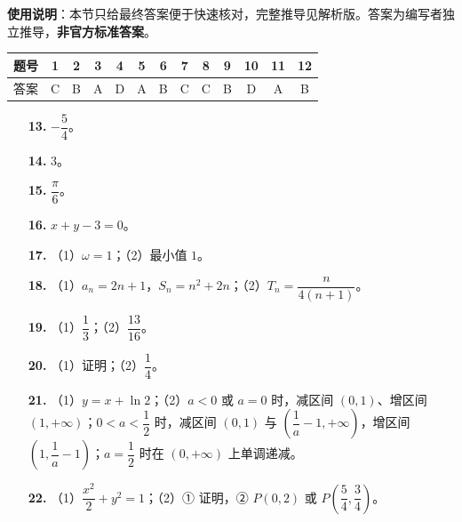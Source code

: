 
\begin{gknotice}
\textbf{使用说明}：本节只给最终答案便于快速核对，完整推导见解析版。答案为编写者独立推导，\textbf{非官方标准答案}。
\end{gknotice}

\begin{center}\begin{tabular}{ccccccccccccc}
\toprule
题号 & 1 & 2 & 3 & 4 & 5 & 6 & 7 & 8 & 9 & 10 & 11 & 12 \\
\midrule
答案 & C & B & A & D & A & B & C & C & B & D & A & B \\
\bottomrule
\end{tabular}\end{center}

\begin{itemize}[leftmargin=2.6em]
  \item[\textbf{13.}] $-\dfrac54$。
  \item[\textbf{14.}] $3$。
  \item[\textbf{15.}] $\dfrac\pi6$。
  \item[\textbf{16.}] $x+y-3=0$。
\end{itemize}

\begin{itemize}[leftmargin=2.6em]
  \item[\textbf{17.}] （1）$\omega=1$；（2）最小值 $1$。
  \item[\textbf{18.}] （1）$a_n=2n+1$，$S_n=n^2+2n$；（2）$T_n=\dfrac{n}{4(n+1)}$。
  \item[\textbf{19.}] （1）$\dfrac13$；（2）$\dfrac{13}{16}$。
  \item[\textbf{20.}] （1）证明；（2）$\dfrac14$。
  \item[\textbf{21.}] （1）$y=x+\ln2$；（2）$a<0$ 或 $a=0$ 时，减区间 $(0,1)$、增区间 $(1,+\infty)$；$0<a<\dfrac12$ 时，减区间 $(0,1)$ 与 $\left(\dfrac1a-1,+\infty\right)$，增区间 $\left(1,\dfrac1a-1\right)$；$a=\dfrac12$ 时在 $(0,+\infty)$ 上单调递减。
  \item[\textbf{22.}] （1）$\dfrac{x^2}{2}+y^2=1$；（2）① 证明，② $P(0,2)$ 或 $P\left(\dfrac54,\dfrac34\right)$。
\end{itemize}
